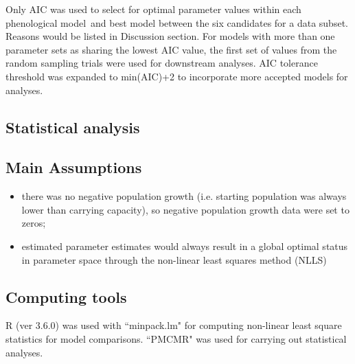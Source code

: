 \documentclass[a4paper, 11pt]{article}
\newcommand{\pml}{phenological model}
\begin{document}
	Only AIC\autocite{johnson2004model,akaike1998information,burnhamdr} was used to select for optimal parameter values within each \pml\ and best model between the six candidates for a data subset.  Reasons would be listed in Discussion section.  For models with more than one parameter sets as sharing the lowest AIC value, the first set of values from the random sampling trials were used for downstream analyses.  AIC tolerance threshold was expanded to min(AIC)+2\autocite{burnham2004multimodel} to incorporate more accepted models for analyses.
	
	\subsection*{Statistical analysis}
	
	\subsection*{Main Assumptions}
	\begin{itemize}
		\item there was no negative population growth (i.e. starting population was always lower than carrying capacity), so negative population growth data were set to zeros;
		\item estimated parameter estimates would always result in a global optimal status in parameter space through the non-linear least squares method (NLLS)
	\end{itemize}
	
	\subsection*{Computing tools}
	R (ver 3.6.0)\autocite{Rcore} was used with ``minpack.lm"\autocite{minpacklm} for computing non-linear least square statistics for model comparisons. ``PMCMR"\autocite{PMCMR} was used for carrying out statistical analyses.
	
\end{document}
